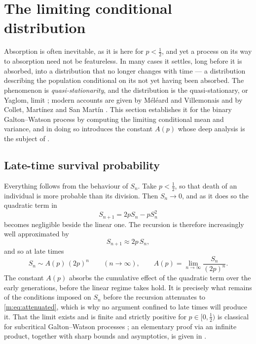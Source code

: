 \section{The limiting conditional distribution}
\label{m:sec:qsd}

Absorption is often inevitable, as it is here for $p<\tfrac12$, and yet a process
on its way to absorption need not be featureless. In many cases it settles, long
before it is absorbed, into a distribution that no longer changes with time --- a
distribution describing the population conditional on its not yet having been
absorbed. The phenomenon is \emph{quasi-stationarity}, and the distribution is the
quasi-stationary, or Yaglom, limit \cite{Yaglom1947}; modern accounts are given by
Méléard and Villemonais \cite{Meleard2012} and by Collet, Martínez and San Martín
\cite{Collet2013}. This section establishes it for the binary Galton--Watson
process by computing the limiting conditional mean and variance, and in doing so
introduces the constant $A(p)$ whose deep analysis is the subject of \ChA.

\subsection{Late-time survival probability}
\label{m:sec:lateS}

Everything follows from the behaviour of $S_n$. Take $p<\tfrac12$, so that death of
an individual is more probable than its division. Then $S_n\to0$, and as it does so
the quadratic term in
\begin{equation*}
S_{n+1} = 2pS_n - pS_n^2
\end{equation*}
becomes negligible beside the linear one. The recursion is therefore increasingly
well approximated by
\begin{equation}
\label{m:eq:attenuated}
S_{n+1}\approx 2p\,S_n ,
\end{equation}
and so at late times
\begin{equation}
\label{m:eq:lateS}
S_n \sim A(p)\,(2p)^n\qquad(n\to\infty),
\qquad
A(p) = \lim_{n\to\infty}\frac{S_n}{(2p)^n} .
\end{equation}
The constant $A(p)$ absorbs the cumulative effect of the quadratic term over the
early generations, before the linear regime takes hold. It is precisely what
remains of the conditions imposed on $S_n$ before the recursion attenuates to
\cref{m:eq:attenuated}, which is why no argument confined to late times will produce
it. That the limit exists and is finite and strictly positive for
$p\in[0,\tfrac12)$ is classical for subcritical Galton--Watson processes
\cite{Athreya1972,Yaglom1947}; an elementary proof via an infinite product, together
with sharp bounds and asymptotics, is given in \ChA.

